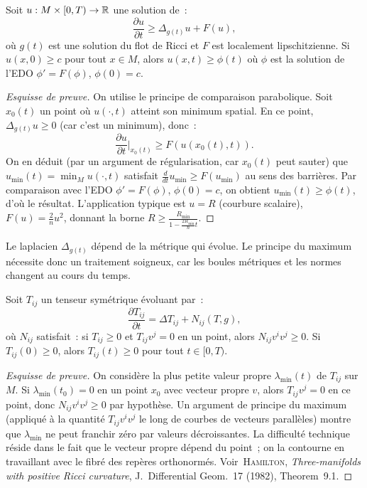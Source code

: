 \begin{theoreme}
\label{thm:maximum_scalaire}
Soit $u : M \times [0, T) \to \mathbb{R}$ une solution de~:
\[
    \frac{\partial u}{\partial t} \geq \Delta_{g(t)} u + F(u),
\]
o\`u $g(t)$ est une solution du flot de Ricci et $F$ est localement lipschitzienne.
Si $u(x, 0) \geq c$ pour tout $x \in M$, alors $u(x, t) \geq \phi(t)$ o\`u $\phi$
est la solution de l'EDO $\phi' = F(\phi)$, $\phi(0) = c$.
\end{theoreme}

\begin{proof}[Esquisse de preuve]
On utilise le principe de comparaison parabolique. Soit $x_0(t)$ un point o\`u
$u(\cdot, t)$ atteint son minimum spatial. En ce point, $\Delta_{g(t)} u \geq 0$
(car c'est un minimum), donc~:
\[
    \frac{\partial u}{\partial t}\bigg|_{x_0(t)} \geq F(u(x_0(t), t)).
\]
On en d\'eduit (par un argument de r\'egularisation, car $x_0(t)$ peut sauter)
que $u_{\min}(t) = \min_M u(\cdot, t)$ satisfait $\frac{d}{dt} u_{\min} \geq F(u_{\min})$
au sens des barri\`eres. Par comparaison avec l'EDO $\phi' = F(\phi)$, $\phi(0) = c$,
on obtient $u_{\min}(t) \geq \phi(t)$, d'o\`u le r\'esultat.
L'application typique est $u = R$ (courbure scalaire), $F(u) = \frac{2}{n}u^2$,
donnant la borne $R \geq \frac{R_{\min}}{1 - \frac{2R_{\min}}{n}t}$.
\end{proof}

\begin{attention}[title=\textbf{La m\'etrique d\'epend du temps}]
Le laplacien $\Delta_{g(t)}$ d\'epend de la m\'etrique qui \'evolue. Le principe du
maximum n\'ecessite donc un traitement soigneux, car les boules m\'etriques et les
normes changent au cours du temps.
\end{attention}

\begin{theoreme}
\label{thm:maximum_tensoriel}
Soit $T_{ij}$ un tenseur sym\'etrique \'evoluant par~:
\[
    \frac{\partial T_{ij}}{\partial t} = \Delta T_{ij} + N_{ij}(T, g),
\]
o\`u $N_{ij}$ satisfait~: si $T_{ij} \geq 0$ et $T_{ij}v^j = 0$ en un point,
alors $N_{ij} v^i v^j \geq 0$. Si $T_{ij}(0) \geq 0$, alors $T_{ij}(t) \geq 0$
pour tout $t \in [0, T)$.
\end{theoreme}

\begin{proof}[Esquisse de preuve]
On consid\`ere la plus petite valeur propre $\lambda_{\min}(t)$ de $T_{ij}$ sur $M$.
Si $\lambda_{\min}(t_0) = 0$ en un point $x_0$ avec vecteur propre $v$, alors
$T_{ij}v^j = 0$ en ce point, donc $N_{ij}v^i v^j \geq 0$ par hypoth\`ese. Un
argument de principe du maximum (appliqu\'e \`a la quantit\'e $T_{ij}v^i v^j$ le long
de courbes de vecteurs parall\`eles) montre que $\lambda_{\min}$ ne peut franchir
z\'ero par valeurs d\'ecroissantes. La difficult\'e technique r\'eside dans le fait
que le vecteur propre d\'epend du point~; on la contourne en travaillant avec le
fibr\'e des rep\`eres orthonorm\'es.
Voir~\textsc{Hamilton}, \emph{Three-manifolds with positive Ricci curvature},
J.~Differential Geom.~17 (1982), Theorem~9.1.
\end{proof}


